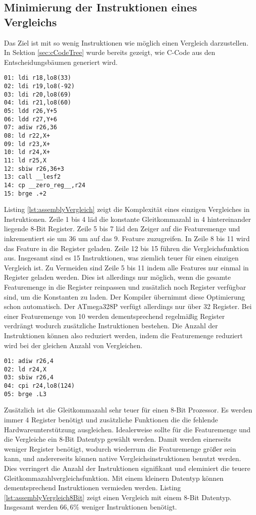 \subsection{Minimierung der Instruktionen eines Vergleichs}
Das Ziel ist mit so wenig Instruktionen wie möglich einen Vergleich darzustellen. In Sektion \ref{sec:cCodeTree} wurde
bereits gezeigt, wie C-Code aus den Entscheidungsbäumen generiert wird.
\begin{lstlisting}[label=lst:assemblyVergleich,caption={Vergleich von Gleitkommazahl-Feature mit konstanter Gleitkommazahl.}]
01: ldi r18,lo8(33)
02: ldi r19,lo8(-92)
03: ldi r20,lo8(69)
04: ldi r21,lo8(60)
05: ldd r26,Y+5
06: ldd r27,Y+6
07: adiw r26,36
08: ld r22,X+
09: ld r23,X+
10: ld r24,X+
11: ld r25,X
12: sbiw r26,36+3
13: call __lesf2
14: cp __zero_reg__,r24
15: brge .+2
\end{lstlisting}
Listing \ref{lst:assemblyVergleich} zeigt die Komplexität eines einzigen Vergleiches in Instruktionen. Zeile 1 bis 4 läd die konstante Gleitkommazahl in 4 hintereinander liegende 8-Bit Register. Zeile 5
bis 7 läd den Zeiger auf die Featuremenge und inkrementiert sie um 36 um auf das 9. Feature zuzugreifen. In Zeile 8 bis 11 wird das Feature in die Register geladen. Zeile 12 bis 15 führen die
Vergleichsfunktion aus. Insgesamt sind es 15 Instruktionen, was ziemlich teuer für einen einzigen Vergleich ist.
\newline
\newline
Zu Vermeiden sind Zeile 5 bis 11 indem alle Features nur einmal in Register geladen werden. Dies ist allerdings nur möglich, wenn die gesamte Featuremenge in die Register reinpassen und zusätzlich
noch Register verfügbar sind, um die Konstanten zu laden. Der Kompiler übernimmt diese Optimierung schon automatisch. Der ATmega328P verfügt allerdings nur über 32 Register.
Bei einer Featuremenge von 10 werden dementsprechend regelmäßig Register verdrängt wodurch zusätzliche Instruktionen bestehen. Die Anzahl der Instruktionen können also reduziert werden, indem
die Featuremenge reduziert wird bei der gleichen Anzahl von Vergleichen.
\begin{lstlisting}[label=lst:assemblyVergleich8Bit,caption={Vergleich von 8-Bit-Feature mit konstanter 8-Bit Zahl.}]
01: adiw r26,4
02: ld r24,X
03: sbiw r26,4
04: cpi r24,lo8(124)
05: brge .L3
\end{lstlisting}
Zusätzlich ist die Gleitkommazahl sehr teuer für einen 8-Bit Prozessor. Es werden immer 4 Register benötigt und zusätzliche Funktionen die die fehlende Hardwareunterstützung ausgleichen. Idealerweise sollte
für die Featuremenge und die Vergleiche ein 8-Bit Datentyp gewählt werden. Damit werden einerseits weniger Register benötigt, wodurch wiederrum die Featuremenge größer sein kann, und andererseits können
native Vergleichsinstruktionen benutzt werden. Dies verringert die Anzahl der Instruktionen signifikant und eleminiert die teuere Gleitkommazahlvergleichsfunktion. Mit einem kleinern Datentyp können
dementsprechend Instruktionen vermieden werden. Listing \ref{lst:assemblyVergleich8Bit} zeigt einen Vergleich mit einem 8-Bit Datentyp. Insgesamt werden $66,6\%$ weniger Instruktionen benötigt.

